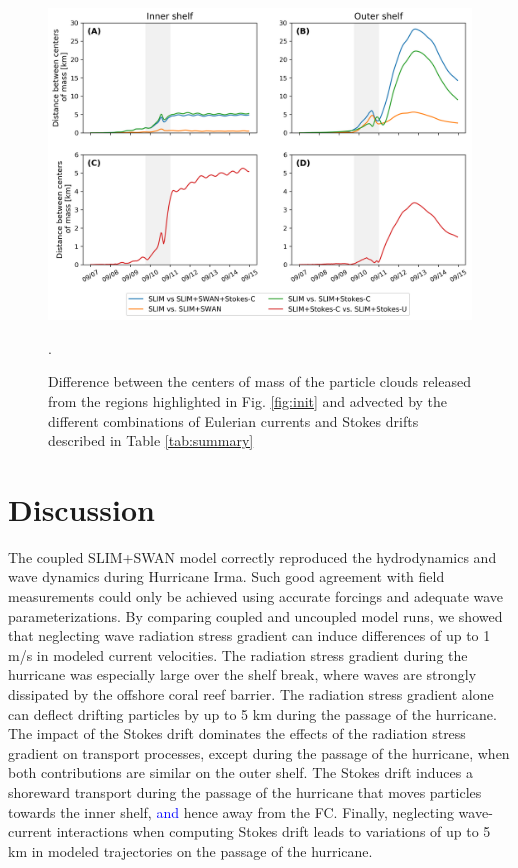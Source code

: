 \documentclass[preprint,12pt,authoryear]{elsarticle}
\newcommand{\modif}[1]{\textcolor{blue}{#1}}
\begin{document}
\begin{figure}
    \centering
    \includegraphics[width=.99\textwidth]{figures/trajectory_comparisons.png}
    \caption{Difference between the centers of mass of the particle clouds released from the regions highlighted in Fig. \ref{fig:init} and advected by the different combinations of Eulerian currents and Stokes drifts described in Table \ref{tab:summary}}.
    \label{fig:traj}
\end{figure}


\section{Discussion}
The coupled SLIM+SWAN model correctly reproduced the hydrodynamics and wave dynamics during Hurricane Irma. Such good agreement with field measurements could only be achieved using accurate forcings and adequate wave parameterizations. By comparing coupled and uncoupled model runs, we showed that neglecting wave radiation stress gradient can induce differences of up to 1 m/s in modeled current velocities. The radiation stress gradient during the hurricane was especially large over the shelf break, where waves are strongly dissipated by the offshore coral reef barrier. The radiation stress gradient alone can deflect drifting particles by up to 5 km during the passage of the hurricane. The impact of the Stokes drift dominates the effects of the radiation stress gradient on transport processes, except during the passage of the hurricane, when both contributions are similar on the outer shelf. The Stokes drift induces a shoreward transport during the passage of the hurricane that moves particles towards  the inner shelf, \modif{and} hence away from the FC. Finally, neglecting wave-current interactions when computing Stokes drift leads to variations of up to 5 km in modeled trajectories on the passage of the hurricane.
\end{document}
